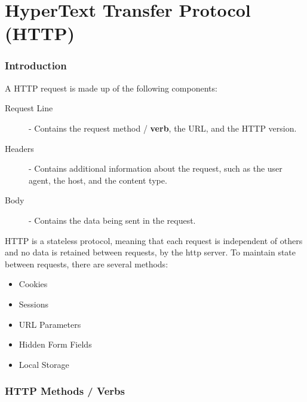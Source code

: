 \documentclass[12pt letter]{report}
\begin{document}

\chapter{HyperText Transfer Protocol (HTTP)}

\subsection{Introduction}


A HTTP request is made up of the following components:
\begin{description}
  \item[Request Line] - Contains the request method / \textbf{verb}, the URL, and the HTTP version.
  \item[Headers] - Contains additional information about the request, such as the user agent, the host, and the content type.
  \item[Body] - Contains the data being sent in the request.
\end{description}

HTTP is a stateless protocol, meaning that each request is independent of others and no data is retained between
requests, by the http server. To maintain state between requests, there are several methods:
\begin{itemize}
  \item Cookies
  \item Sessions
  \item URL Parameters
  \item Hidden Form Fields
  \item  Local Storage
\end{itemize}

\subsection{HTTP Methods / Verbs}

\end{document}
